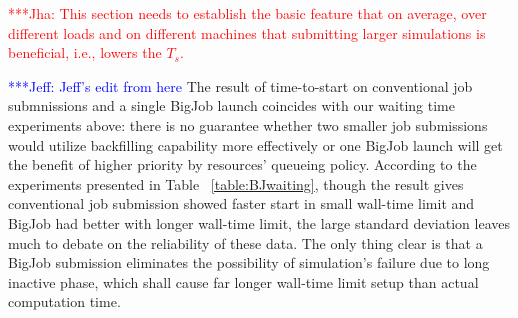 \documentclass[conference,final]{IEEEtran}
\newcommand{\jhanote}[1]{ {\textcolor{red} { ***Jha: #1 }}}
\newcommand{\skonote}[1]{ {\textcolor{blue} { ***Jeff: #1 }}}
\newcommand{\jhanote}[1]{}
\newcommand{\skonote}[1]{}
\newcommand{\ts}{$T_{s}$}
\begin{document}
\jhanote{This section needs to establish the basic feature that on
  average, over different loads and on different machines that
  submitting larger simulations is beneficial, i.e., lowers the \ts.}

\skonote{Jeff's edit from here}
The result of time-to-start on conventional job submnissions and a single BigJob launch coincides with our waiting time experiments above: 
there is no guarantee whether two smaller job submissions would utilize backfilling capability more effectively or one BigJob launch will get the benefit of higher priority by resources' queueing policy. According to the experiments presented in Table ~\ref{table:BJwaiting}, though the result gives conventional job submission showed faster start in small wall-time limit and BigJob had better with longer wall-time limit, the large standard deviation leaves much to debate on the reliability of these data. The only thing clear is that a BigJob submission eliminates the possibility of simulation's failure due to long inactive phase, which shall cause far longer wall-time limit setup than actual computation time.
\end{document}
